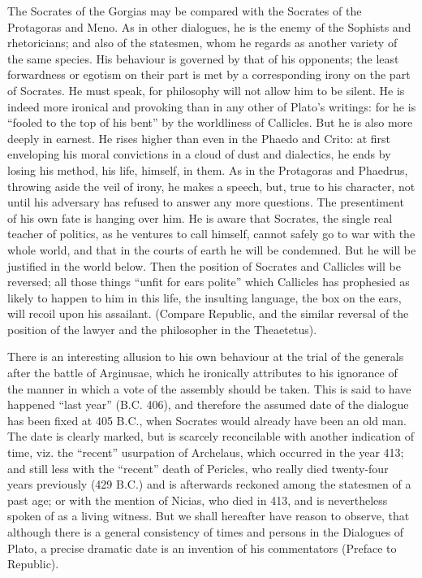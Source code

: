 \documentclass[11pt,letter]{article}
\begin{document}
\par  The Socrates of the Gorgias may be compared with the Socrates of the Protagoras and Meno. As in other dialogues, he is the enemy of the Sophists and rhetoricians; and also of the statesmen, whom he regards as another variety of the same species. His behaviour is governed by that of his opponents; the least forwardness or egotism on their part is met by a corresponding irony on the part of Socrates. He must speak, for philosophy will not allow him to be silent. He is indeed more ironical and provoking than in any other of Plato’s writings: for he is “fooled to the top of his bent” by the worldliness of Callicles. But he is also more deeply in earnest. He rises higher than even in the Phaedo and Crito: at first enveloping his moral convictions in a cloud of dust and dialectics, he ends by losing his method, his life, himself, in them. As in the Protagoras and Phaedrus, throwing aside the veil of irony, he makes a speech, but, true to his character, not until his adversary has refused to answer any more questions. The presentiment of his own fate is hanging over him. He is aware that Socrates, the single real teacher of politics, as he ventures to call himself, cannot safely go to war with the whole world, and that in the courts of earth he will be condemned. But he will be justified in the world below. Then the position of Socrates and Callicles will be reversed; all those things “unfit for ears polite” which Callicles has prophesied as likely to happen to him in this life, the insulting language, the box on the ears, will recoil upon his assailant. (Compare Republic, and the similar reversal of the position of the lawyer and the philosopher in the Theaetetus).

\par  There is an interesting allusion to his own behaviour at the trial of the generals after the battle of Arginusae, which he ironically attributes to his ignorance of the manner in which a vote of the assembly should be taken. This is said to have happened “last year” (B.C. 406), and therefore the assumed date of the dialogue has been fixed at 405 B.C., when Socrates would already have been an old man. The date is clearly marked, but is scarcely reconcilable with another indication of time, viz. the “recent” usurpation of Archelaus, which occurred in the year 413; and still less with the “recent” death of Pericles, who really died twenty-four years previously (429 B.C.) and is afterwards reckoned among the statesmen of a past age; or with the mention of Nicias, who died in 413, and is nevertheless spoken of as a living witness. But we shall hereafter have reason to observe, that although there is a general consistency of times and persons in the Dialogues of Plato, a precise dramatic date is an invention of his commentators (Preface to Republic).
\end{document}
